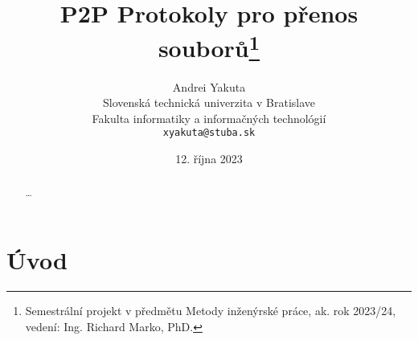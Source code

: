 \documentclass[10pt,twoside,czech,a4paper]{article}
\title{P2P Protokoly pro přenos souborů\thanks{Semestrální projekt v předmětu Metody inženýrské práce, ak. rok 2023/24, vedení: Ing. Richard Marko, PhD.}}
\author{Andrei Yakuta\\[2pt]
	{\small Slovenská technická univerzita v Bratislave}\\
	{\small Fakulta informatiky a informačných technológií}\\
	{\small \texttt{xyakuta@stuba.sk}}
	}
\date{\small 12. října 2023}
\begin{document}
\maketitle

\begin{abstract}
\ldots
\end{abstract}



\section{Úvod}




\end{document}
